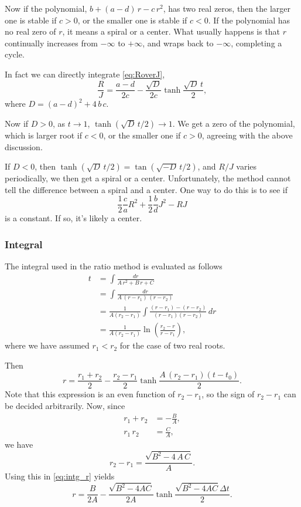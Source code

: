 \documentclass{book}
\begin{document}
Now if the polynomial, $b + (a - d) \, r - c \, r^2$,
has two real zeros, then the larger one is stable if $c > 0$,
or the smaller one is stable if $c < 0$.
%
If the polynomial has no real zero of $r$, it means a spiral or a center.
What usually happens is that $r$ continually increases
from $-\infty$ to $+\infty$, and wraps back to $-\infty$,
completing a cycle.


In fact we can directly integrate \eqref{eq:RoverJ},
$$
\frac{R}{J}
=
\frac{a - d}{2 c}
-\frac{ \sqrt D }{2 c}
\tanh\frac{ \sqrt D \, t } { 2 },
$$
where $D = (a - d)^2 + 4 \, b \, c$.


Now if $D > 0$, as $t \rightarrow 1$, $\tanh (\sqrt D \,t /2) \rightarrow 1$.
We get a zero of the polynomial, which is larger root if $c < 0$,
or the smaller one if $c > 0$, agreeing with the above discussion.

If $D < 0$, then $\tanh(\sqrt D \, t/2) = \tan(\sqrt{-D} \, t/2)$,
and $R/J$ varies periodically, we then get a spiral or a center.
Unfortunately, the method cannot tell the difference between
a spiral and a center.  One way to do this is to see if
$$
\frac{1}{2} \frac{c}{a} R^2 + \frac{1}{2} \frac{b}{d} J^2 - R J
$$
is a constant.  If so, it's likely a center.



\subsubsection{Integral}


The integral used in the ratio method is evaluated as follows
$$
\begin{aligned}
t &= \int \frac { dr } { A \, r^2 + B \, r + C } \\
  &= \int \frac { dr } { A \, (r - r_1) \, (r - r_2) } \\
  &= \frac{1}{A(r_2 - r_1)}
  \int \frac{ (r - r_1) - (r - r_2) }
  { (r - r_1) (r - r_2) } \, d r \\
  &= \frac{1}{A(r_2 - r_1) }
  \ln \left( \frac{ r_2 - r } { r - r_1 } \right),
\end{aligned}
$$
where we have assumed $r_1 < r_2$ for the case of two real roots.

Then
\begin{equation}
r =
\frac{r_1 + r_2}{2}
-
\frac{r_2 - r_1}{2}
\tanh\frac{A \, (r_2 - r_1) (t - t_0)}{2}.
\label{eq:intg_r}
\end{equation}
Note that this expression is an even function of $r_2 - r_1$,
so the sign of $r_2 - r_1$ can be decided arbitrarily.
%
Now, since
$$
\begin{aligned}
  r_1 + r_2 &= - \frac B A, \\
  r_1 \, r_2 &= \frac C A,
\end{aligned}
$$
we have
$$
r_2 - r_1 = \frac{ \sqrt{ B^2 - 4 \, A \, C } }{ A }.
$$
Using this in \eqref{eq:intg_r} yields
$$
r = \frac{B}{2A} - \frac{\sqrt{B^2 - 4AC}}{2A} \tanh\frac{\sqrt{B^2 -4AC}\Delta t}{2}.
$$
\end{document}
